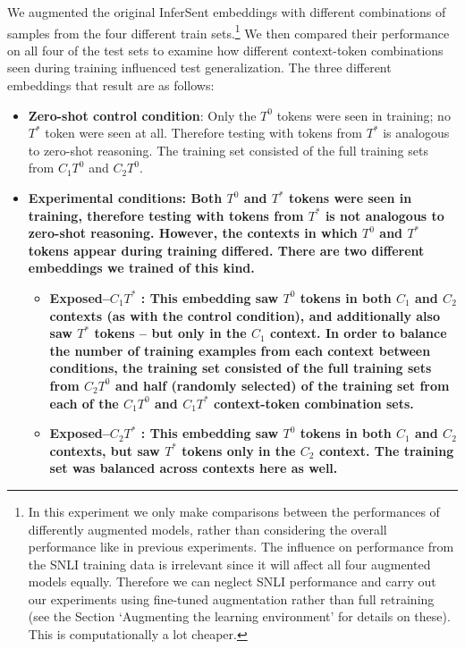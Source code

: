 We augmented the original InferSent embeddings with different combinations of samples from the four different train sets.\footnote{In this experiment we only make comparisons between the performances of differently augmented models, rather than considering the overall performance like in previous experiments. The influence on performance from the SNLI training data is irrelevant since it will affect all four augmented models equally. Therefore we can neglect SNLI performance and carry out our experiments using fine-tuned augmentation rather than full retraining (see the Section `Augmenting the learning environment' for details on these). This is computationally a lot cheaper.} We then compared their performance on all four of the test sets to examine how different context-token combinations seen during training influenced test generalization. The three different embeddings that result are as follows:
\vspace{-2mm}
\begin{itemize}
\itemsep0em
    \item \textbf{Zero-shot control condition}: Only the $T^{0}$ tokens were seen in training; no $T^{*}$ token were seen at all. Therefore testing with tokens from $T^{*}$ is analogous to zero-shot reasoning. The training set consisted of the full training sets from $C_{1}T^{0}$ and $C_{2}T^{0}$.
    \item \bf{Experimental conditions}: Both $T^{0}$ and $T^{*}$ tokens were seen in training, therefore testing with tokens from $T^{*}$ is not analogous to zero-shot reasoning. However, the contexts in which $T^{0}$ and $T^{*}$ tokens appear during training differed. There are two different embeddings we trained of this kind.
    \begin{itemize}
        \item \bf{Exposed--$C_{1}T^{*}$ }: This embedding saw $T^{0}$ tokens in both $C_{1}$ and $C_{2}$ contexts (as with the control condition), and additionally also saw $T^{*}$ tokens -- but only in the $C_{1}$ context.
        In order to balance the number of training examples from each context between conditions, the training set consisted of the full training sets from $C_{2}T^{0}$ and half (randomly selected) of the training set from each of the $C_{1}T^{0}$ and $C_{1}T^{*}$ context-token combination sets.
        \item \bf{Exposed--$C_{2}T^{*}$ }: This embedding saw $T^{0}$ tokens in both $C_{1}$ and $C_{2}$ contexts, but saw $T^{*}$ tokens only in the $C_{2}$ context. The training set was balanced across contexts here as well.
    \end{itemize}
\end{itemize}


